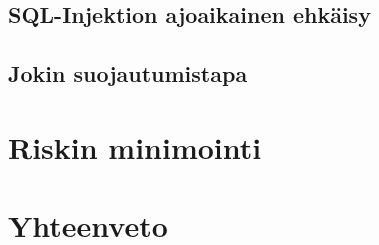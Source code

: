 \documentclass[finnish]{tktltiki2}
\theoremstyle{definition}
\theoremstyle{remark}
\begin{document}
\subsection{SQL-Injektion ajoaikainen ehkäisy}
\subsection {Jokin suojautumistapa}
\section {Riskin minimointi}
\section {Yhteenveto}




%
%
% 
%







% 
\end{document}

